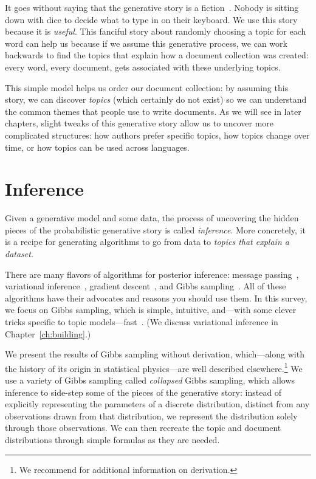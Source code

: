 It goes without saying that the generative story is a fiction~\citep{box-87}.
Nobody is sitting down with dice to decide what to type in on their keyboard.
We use this story because it is \emph{useful}.  This fanciful story about randomly
choosing a topic for each word can help us because if we assume this generative
process, we can work backwards to find the topics that explain how a document
collection was created: every word, every document, gets associated with these
underlying topics.

This simple model helps us order our document collection: by assuming this story, we
can discover \emph{topics} (which certainly do not exist) so we can understand
the common themes that people use to write documents.  As we will see in later
chapters, slight tweaks of this generative story allow us to uncover more
complicated structures: how authors prefer specific topics, how topics change
over time, or how topics can be used across languages.

\section{Inference}

Given a generative model and some data, the process of uncovering the hidden
 pieces of the probabilistic generative story is called \emph{inference}.  More
concretely, it is a recipe for generating algorithms to go from data to
\emph{topics that explain a dataset}.

There are many flavors of algorithms for posterior inference: message
passing~\citep{zeng-13}, variational inference~\citep{blei-03},
gradient descent~\citep{hoffman-10}, and Gibbs
sampling~\citep{griffiths-04}.  All of these algorithms have their
advocates and reasons you should use them.  In this survey, we focus
on Gibbs sampling, which is simple, intuitive, and---with some clever
tricks specific to topic models---fast~\citep{yao-09}.  (We discuss
variational inference in Chapter~\ref{ch:building}.)

We present the results of Gibbs sampling without derivation,
which---along with the history of its origin in statistical
physics---are well described elsewhere.\footnote{We recommend
  \citet{resnik-09} for additional information on derivation.} We use
a variety of Gibbs sampling called \emph{collapsed} Gibbs sampling,
which allows inference to side-step some of the pieces of the
generative story: instead of explicitly representing the parameters of
a discrete distribution, distinct from any observations drawn from
that distribution, we represent the distribution solely through those
observations.  We can then recreate the topic and document
distributions through simple formulas as they are needed.

